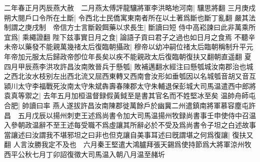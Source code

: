 二年春正月丙辰燕大赦　二月燕太傅評龍驤將軍李洪略地河南|{
	驤思將翻}
三月庚戍朔大閱戶口令所在土斷|{
	令西北士民僑寓東南者所在以土著爲斷也斷丁亂翻}
嚴其法制謂之庚戌制　帝信方士言斷穀餌藥以求長生|{
	斷讀曰短}
侍中高崧諫曰此非萬乘所宜爲|{
	乘繩證翻}
陛下兹事實日月之食|{
	論語子貢曰君子之過也如日月之食焉}
不聽辛未帝以藥發不能親萬幾禇太后復臨朝攝政|{
	穆帝以幼冲嗣位禇太后臨朝稱制升平元年帝加元服太后歸政帝卽位年長矣以疾不能親政太后復臨朝復扶又翻朝直遥翻}
夏四月甲辰燕李洪攻許昌汝南敗晉兵于懸瓠|{
	敗補邁翻水經注曰懸瓠城汝南郡治也城之西北汝水枝别左出西北流又屈西東轉又西南會汝形如垂瓠因以名城瓠音胡又音互}
潁川太守李福戰死汝南太守朱斌犇壽春陳郡太守朱輔退保彭城大司馬温遣西中郎將袁真等禦之|{
	去年五月加桓温督録假黃鉞至是書其官名而不姓堅冰至矣}
温帥舟師屯合肥|{
	帥讀曰率}
燕人遂拔許昌汝南陳郡徙萬餘戶於幽冀二州遣鎮南將軍慕容塵屯許昌　五月戊辰以揚州刺吏王述爲尚書令加大司馬温揚州牧録尚書事壬申使侍中召温入參朝政温辭不至王述每受職不爲虛讓其所辭必於不受及爲尚書令子坦之白述故事當讓述曰汝謂我不堪邪坦之曰非也但克讓自美事耳述曰旣謂堪之何爲復讓|{
	復扶又翻}
人言汝勝我定不及也　六月秦王堅遣大鴻臚拜張天錫爲使持節爲大將軍涼州牧西平公秋七月丁卯詔復徵大司馬温入朝八月温至赭圻

